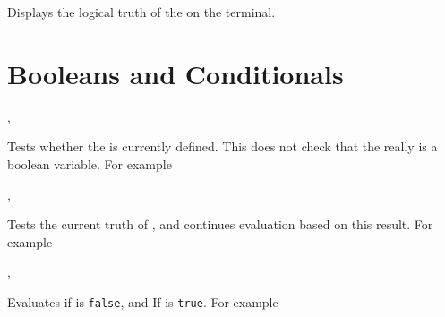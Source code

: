 \documentclass[oneside]{book}
\begin{document}
\begin{function}{\BoolVarShow}
\begin{syntax}
 
\end{syntax}
Displays the logical truth of the  on the terminal.
\end{function}

\section{Booleans and Conditionals}

\begin{function}{\BoolIfExist,\BoolIfExistTF}
\begin{syntax}
 
   
\end{syntax}
Tests whether the  is currently defined.  This does not
check that the  really is a boolean variable.
For example
\begin{demohigh}
\BoolIfExistTF {} {}
\BoolIfExistTF {} {}
\end{demohigh}
\end{function}

\begin{function}{\BoolVarIf,\BoolVarIfTF}
\begin{syntax}
 
   
\end{syntax}
Tests the current truth of , and continues evaluation
based on this result. For example
\begin{demohigh}
\BoolSetTrue \lTmpaBool
\BoolVarIfTF {} {}
\BoolSetFalse \lTmpaBool
\BoolVarIfTF {} {}
\end{demohigh}
\end{function}

\begin{function}{\BoolVarNot,\BoolVarNotTF}
\begin{syntax}
 
   
\end{syntax}
Evaluates  if  is \verb!false!,
and  If  is \verb!true!.
For example
\begin{demohigh}
 {} {}
\end{demohigh}
\end{function}
\end{document}
